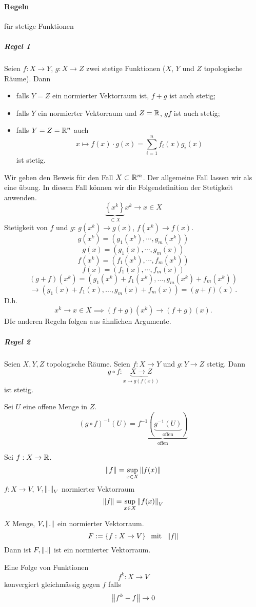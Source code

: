 \paragraph{Regeln} für stetige Funktionen
\subparagraph{Regel 1}
Seien $f:X\to Y$, $g:X\to Z$ zwei stetige Funktionen ($X$, $Y$ und $Z$ topologische R\"aume).
Dann
  \begin{itemize}
\item falls $Y=Z$ ein normierter Vektorraum ist, $f+g$ ist auch stetig;
\item falls $Y$ ein normierter Vektorraum und $Z=\mathbb{R}$, $gf$ ist auch stetig;
\item falls $Y=Z=\mathbb{R}^n$ auch
\[ x\mapsto f(x)\cdot g(x)=\sum_{i=1}^nf_i(x)g_i(x)\]
ist stetig.
  \end{itemize}
\begin{Bew} Wir geben den Beweis
  f\"ur den Fall $X\subset \mathbb{R}^m$. Der allgemeine Fall lassen wir als eine \"ubung.
In diesem Fall k\"onnen wir die Folgendefinition der Stetigkeit anwenden.
  \[\underbrace{\left\{ x^k \right\}}_{\subset X} x^k\to x\in X\]
  Stetigkeit von $f$ und $g$: $g(x^k)\to g(x)$, $f(x^k)\to f(x)$.
  \[g(x^k)=(g_1(x^k),\cdots,g_m(x^k))\]
  \[g(x)=(g_1(x),\cdots,g_m(x))\]
  \[f(x^k)=(f_1(x^k),\cdots,f_m(x^k))\]
  \[f(x)=(f_1(x),\cdots,f_m(x))\]
  \[(g+f)(x^k)=\left( g_1(x^k)+f_1(x^k),\ldots,g_m(x^k)+f_m(x^k) \right)\] 
\[ \to (g_1 (x)+f_1 (x), \ldots, g_m (x) + f_m (x)) = (g+f) (x)\, .\]
 D.h.
  \[x^k\to x\in X\implies (f+g)(x^k)\to (f+g)(x).\]
DIe anderen Regeln folgen aus \"ahnlichen Argumente.
\end{Bew}
\subparagraph{Regel 2}
Seien $X,Y,Z$ topologische Räume. Seien $f:X\to Y$ und $g:Y\to Z$ stetig. Dann
\[g\circ f:\underbrace{X\to Z}_{x\mapsto g(f(x))}\]
ist stetig.
\begin{Bew}
  Sei $U$ eine offene Menge in $Z$.
  \[(g\circ f)^{-1}(U)=\underbrace{f^{-1}(\underbrace{g^{-1}(U)}_{\text{offen}})}_{\text{offen}}\]
\end{Bew}
\begin{Def}
  Sei $f:X\rightarrow \mathbb{R}$.
  \[\left\| f \right\|=\sup_{x\in X}\left\| f(x) \right\|\]
  $f:X\to V$, $V,\left\| . \right\|_V$ normierter Vektorraum
  \[\left\| f \right\|=\sup_{x\in X}\left\| f(x) \right\|_V\]
\end{Def}
\begin{Bem}
  $X$ Menge, $V,\left\| . \right\|$ ein normierter Vektorraum.
  \[F:=\left\{ f:X\rightarrow V\right\} \hspace{2mm}\text{mit}\hspace{2mm}\left\| f \right\|\]
  Dann ist $F,\left\| . \right\|$ ist ein normierter Vektorraum.
\end{Bem}
\begin{Def}
  Eine Folge von Funktionen
  \[f^k:X\to V\]
  konvergiert gleichmässig gegen $f$ falls
  \[\left\| f^k-f \right\|\rightarrow 0\]
\end{Def}
